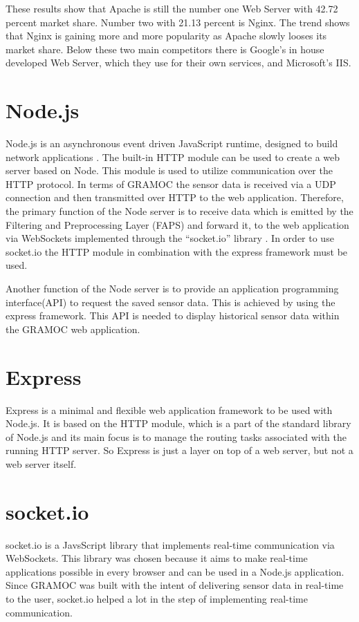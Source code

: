 These results show that Apache is still the number one Web Server with 42.72 percent market share. Number two with 21.13 percent is Nginx. The trend shows that Nginx is gaining more and more popularity as Apache slowly looses its market share. Below these two main competitors there is Google's in house developed Web Server, which they use for their own services, and Microsoft's IIS.

\section{Node.js}
\label{subsec:nodejs}
Node.js is an asynchronous event driven JavaScript runtime, designed to build network applications \autocite{Node}. The built-in HTTP module can be used to create a web server based on Node. This module is used to utilize communication over the HTTP protocol. In terms of GRAMOC the sensor data is received via a UDP connection and then transmitted over HTTP to the web application. Therefore, the primary function of the Node server is to receive data which is emitted by the Filtering and Preprocessing Layer (FAPS) and forward it, to the web application via WebSockets implemented through the ``socket.io'' library \autocite{socketio}. In order to use socket.io the HTTP module in combination with the express framework must be used.

Another function of the Node server is to provide an application programming interface(API) to request the saved sensor data. This is achieved by using the express framework. This API is needed to display historical sensor data within the GRAMOC web application.

\section{Express}
Express is a minimal and flexible web application framework to be used with Node.js. It is based on the HTTP module, which is a part of the standard library of Node.js and its main focus is to manage the routing tasks associated with the running HTTP server. So Express is just a layer on top of a web server, but not a web server itself.

\section{socket.io}
\label{subsec:socketio}
socket.io is a JavsScript library that implements real-time communication via WebSockets. This library was chosen because it aims to make real-time applications possible in every browser and can be used in a Node.js application. Since GRAMOC was built with the intent of delivering sensor data in real-time to the user, socket.io helped a lot in the step of implementing real-time communication.

